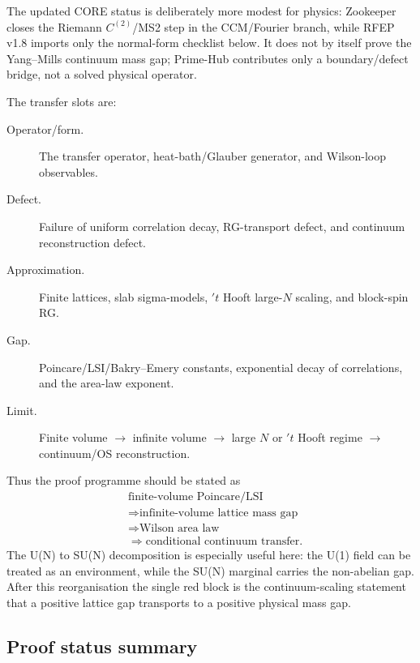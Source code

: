 \documentclass[12pt,a4paper]{article}
\theoremstyle{definition}
\theoremstyle{plain}
\theoremstyle{remark}
\begin{document}
The updated CORE status is deliberately more modest for physics: Zookeeper
closes the Riemann $C^{(2)}$/MS2 step in the CCM/Fourier branch, while
RFEP v1.8 imports only the normal-form checklist below.  It does not by
itself prove the Yang--Mills continuum mass gap; Prime-Hub contributes only
a boundary/defect bridge, not a solved physical operator.

The transfer slots are:
\begin{description}
  \item[Operator/form.] The transfer operator, heat-bath/Glauber
  generator, and Wilson-loop observables.
  \item[Defect.] Failure of uniform correlation decay, RG-transport
  defect, and continuum reconstruction defect.
  \item[Approximation.] Finite lattices, slab sigma-models, $'t$ Hooft
  large-$N$ scaling, and block-spin RG.
  \item[Gap.] Poincare/LSI/Bakry--Emery constants, exponential decay of
  correlations, and the area-law exponent.
  \item[Limit.] Finite volume $\to$ infinite volume $\to$ large $N$ or
  $'t$ Hooft regime $\to$ continuum/OS reconstruction.
\end{description}

Thus the proof programme should be stated as
\begin{align*}
  &\text{finite-volume Poincare/LSI}\\
  &\Longrightarrow \text{infinite-volume lattice mass gap}\\
  &\Longrightarrow \text{Wilson area law}\\
  &\Longrightarrow \text{conditional continuum transfer}.
\end{align*}
The U(N) to SU(N) decomposition is especially useful here: the U(1) field
can be treated as an environment, while the SU(N) marginal carries the
non-abelian gap.  After this reorganisation the single red block is the
continuum-scaling statement that a positive lattice gap transports to a
positive physical mass gap.

\subsection*{Proof status summary}
\end{document}
